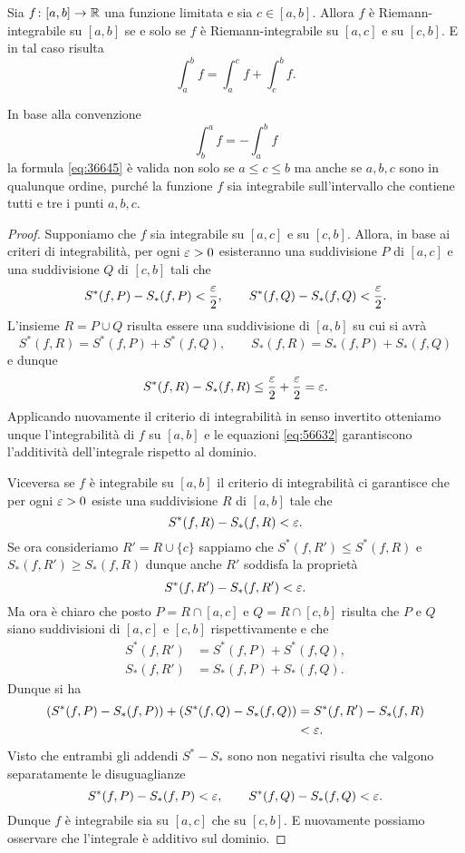 \begin{theorem}
\mymark{*}
\label{th:additivita_integrale}
Sia $f\colon [a,b]\to \mathbb R$ una funzione limitata e sia $c\in [a,b]$.
Allora $f$ è Riemann-integrabile su $[a,b]$ se e solo se
$f$ è Riemann-integrabile su $[a,c]$ e su $[c,b]$.
E in tal caso risulta
\begin{equation}\label{eq:36645}
 \int_a^b f = \int_a^c f + \int_c^b f.
\end{equation}

In base alla convenzione
\[
   \int_b^a f = -\int_a^b f
\]
la formula \eqref{eq:36645} è valida non solo se $a\le c\le b$ ma anche
se $a,b,c$ sono in qualunque ordine, purché la funzione $f$ sia integrabile
sull'intervallo che contiene tutti e tre i punti $a,b,c$.
\end{theorem}
%
\begin{proof}
\mymark{*}
Supponiamo che $f$ sia integrabile su $[a,c]$ e su $[c,b]$.
Allora, in base ai criteri di integrabilità, per ogni $\varepsilon>0$ esisteranno una
suddivisione $P$ di $[a,c]$ e una suddivisione $Q$ di $[c,b]$ tali che
\[
  S^*(f,P) - S_*(f,P) < \frac {\varepsilon} 2,
  \qquad
  S^*(f,Q) - S_*(f,Q) < \frac {\varepsilon} 2.
\]
L'insieme $R=P\cup Q$ risulta essere una suddivisione di $[a,b]$ su cui si avrà
\begin{equation}\label{eq:56632}
S^*(f,R) = S^*(f,P) + S^*(f,Q), \qquad
S_*(f,R) = S_*(f,P) + S_*(f,Q)
\end{equation}
e dunque
\[
S^*(f,R) - S_*(f,R) \le \frac {\varepsilon} 2 + \frac {\varepsilon} 2 = \varepsilon.
\]
Applicando nuovamente il criterio di integrabilità in senso invertito otteniamo
unque l'integrabilità di $f$ su $[a,b]$ e le equazioni
\eqref{eq:56632} garantiscono l'additività dell'integrale rispetto al dominio.

Viceversa se $f$ è integrabile su $[a,b]$ il criterio di integrabilità
ci garantisce che per ogni $\varepsilon>0$ esiste una suddivisione $R$ di $[a,b]$ tale che
\[
S^*(f,R) - S_*(f,R) < \varepsilon.
\]
Se ora consideriamo $R' = R \cup \{c\}$ sappiamo che $S^*(f,R') \le S^*(f,R)$
e $S_*(f,R') \ge S_*(f,R)$ dunque anche $R'$ soddisfa la proprietà
\[
S^*(f,R') - S_*(f,R') < \varepsilon.
\]
Ma ora è chiaro che posto $P=R \cap[a,c]$ e $Q=R\cap[c,b]$ risulta che $P$
e $Q$ siano suddivisioni di $[a,c]$ e $[c,b]$ rispettivamente e che
\begin{align*}
  S^*(f,R') &= S^*(f,P) + S^*(f,Q), \\
  S_*(f,R') &= S_*(f,P) + S_*(f,Q).
\end{align*}
Dunque si ha
\begin{align*}
(S^*(f,P) - S_*(f,P)) + (S^*(f,Q) - S_*(f,Q))
&= S^*(f,R') - S_*(f,R) \\
&< \varepsilon.
\end{align*}
Visto che entrambi gli addendi $S^*-S_*$ sono non negativi
risulta che valgono separatamente le disuguaglianze
\[
S^*(f,P) - S_*(f,P) < \varepsilon, \qquad
S^*(f,Q) - S_*(f,Q) < \varepsilon.
\]
Dunque $f$ è integrabile sia su $[a,c]$ che su $[c,b]$.
E nuovamente possiamo osservare che l'integrale è additivo sul dominio.
\end{proof}


